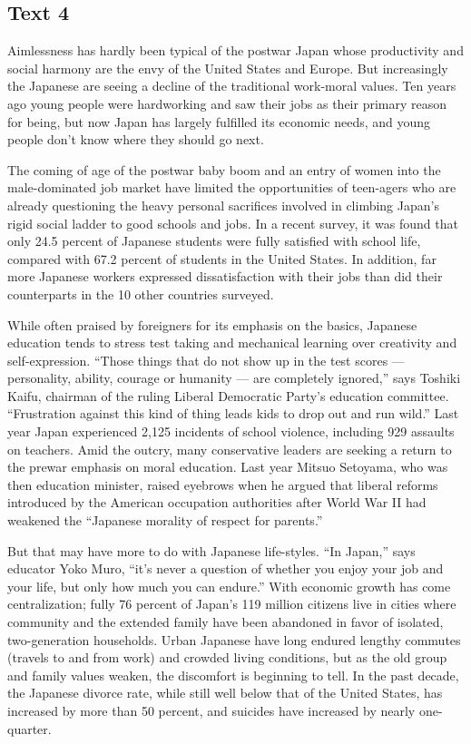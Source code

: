 \documentclass[UTF8,11pt]{ctexart}
\begin{document}
\subsection*{\textbf{Text 4}}


Aimlessness has hardly been typical of the postwar Japan whose productivity and social harmony are the envy of the United States and Europe. But increasingly the Japanese are seeing a decline of the traditional work-moral values. Ten years ago young people were hardworking and saw their jobs as their primary reason for being, but now Japan has largely fulfilled its economic needs, and young people don’t know where they should go next.


The coming of age of the postwar baby boom and an entry of women into the male-dominated job market have limited the opportunities of teen-agers who are already questioning the heavy personal sacrifices involved in climbing Japan’s rigid social ladder to good schools and jobs. In a recent survey, it was found that only 24.5 percent of Japanese students were fully satisfied with school life, compared with 67.2 percent of students in the United States. In addition, far more Japanese workers expressed dissatisfaction with their jobs than did their counterparts in the 10 other countries surveyed.


While often praised by foreigners for its emphasis on the basics, Japanese education tends to stress test taking and mechanical learning over creativity and self-expression. “Those things that do not show up in the test scores — personality, ability, courage or humanity — are completely ignored,” says Toshiki Kaifu, chairman of the ruling Liberal Democratic Party’s education committee. “Frustration against this kind of thing leads kids to drop out and run wild.” Last year Japan experienced 2,125 incidents of school violence, including 929 assaults on teachers. Amid the outcry, many conservative leaders are seeking a return to the prewar emphasis on moral education. Last year Mitsuo Setoyama, who was then education minister, raised eyebrows when he argued that liberal reforms introduced by the American occupation authorities after World War II had weakened the “Japanese morality of respect for parents.”


But that may have more to do with Japanese life-styles. “In Japan,” says educator Yoko Muro, “it’s never a question of whether you enjoy your job and your life, but only how much you can endure.” With economic growth has come centralization; fully 76 percent of Japan’s 119 million citizens live in cities where community and the extended family have been abandoned in favor of isolated, two-generation households. Urban Japanese have long endured lengthy commutes (travels to and from work) and crowded living conditions, but as the old group and family values weaken, the discomfort is beginning to tell. In the past decade, the Japanese divorce rate, while still well below that of the United States, has increased by more than 50 percent, and suicides have increased by nearly one-quarter.
\end{document}
